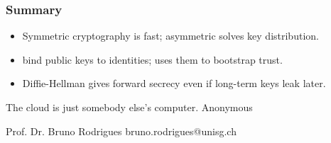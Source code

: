 \documentclass[aspectratio=169]{beamer}
\begin{document}
\begin{frame}
\frametitle{Summary}

\begin{itemize}
  \item Symmetric cryptography is fast; asymmetric solves key distribution.
  \item {} bind public keys to identities;  uses
        them to bootstrap trust.
  \item Diffie-Hellman gives forward secrecy even if long-term keys leak later.
\end{itemize}
\end{frame}

\hsgquote
  {The cloud is just somebody else's computer.}
  {Anonymous}


\hsgclosingcontact
  {Prof. Dr. Bruno Rodrigues}
  {bruno.rodrigues@unisg.ch}
\hsgclosing
\end{document}
